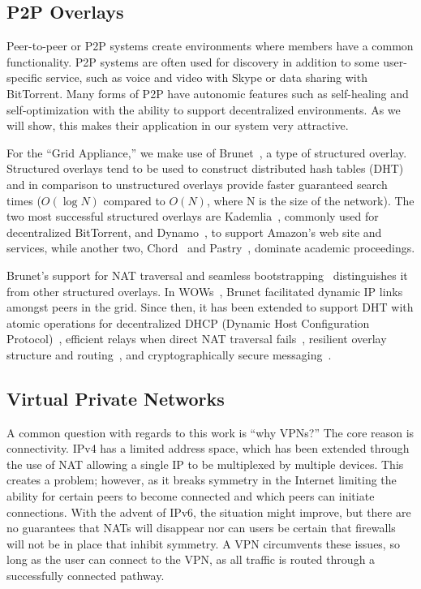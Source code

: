 \documentclass[twocolumn]{svjour3}
\begin{document}
\subsection{P2P Overlays}

Peer-to-peer or P2P systems create environments where members have a common
functionality.  P2P systems are often used for discovery in addition to some
user-specific service, such as voice and video with Skype or data sharing with
BitTorrent.  Many forms of P2P have autonomic features such as self-healing
and self-optimization with the ability to support decentralized environments.
As we will show, this makes their application in our system very attractive.

For the ``Grid Appliance,'' we make use of Brunet~\cite{brunet}, a type of
structured overlay.  Structured overlays tend to be used to construct
distributed hash tables (DHT) and in comparison to unstructured overlays
provide faster guaranteed search times ($O(\log N)$ compared to $O(N)$, where N
is the size of the network).  The two most successful structured overlays are
Kademlia~\cite{kademlia}, commonly used for decentralized BitTorrent, and
Dynamo~\cite{dynamo}, to support Amazon's web site and services, while another
two, Chord~\cite{chord} and Pastry~\cite{pastry}, dominate academic
proceedings.

Brunet's support for NAT traversal and seamless
bootstrapping~\cite{bootstrapping} distinguishes it from other structured
overlays.  In WOWs~\cite{wow}, Brunet facilitated dynamic IP links amongst
peers in the grid.  Since then, it has been extended to support DHT with atomic
operations for decentralized DHCP (Dynamic Host Configuration
Protocol)~\cite{pcgrid07}, efficient relays when direct NAT traversal
fails~\cite{groupvpn}, resilient overlay structure and routing~\cite{hpdc08_0},
and cryptographically secure messaging~\cite{groupvpn}.

\subsection{Virtual Private Networks}

A common question with regards to this work is ``why VPNs?''  The core reason
is connectivity.  IPv4 has a limited address space, which has been extended
through the use of NAT allowing a single IP to be multiplexed by multiple
devices.  This creates a problem; however, as it breaks symmetry in the
Internet limiting the ability for certain peers to become connected and which
peers can initiate connections.  With the advent of IPv6, the situation might
improve, but there are no guarantees that NATs will disappear nor can users be
certain that firewalls will not be in place that inhibit symmetry.  A VPN
circumvents these issues, so long as the user can connect to the VPN, as all
traffic is routed through a successfully connected pathway.
\end{document}
